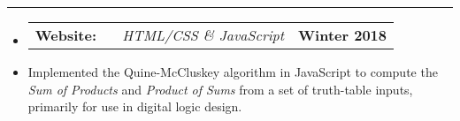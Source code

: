 \documentclass[10pt,letterpaper]{article}
\makeatletter
\newcommand{\header}[2]
{
	\begin{tabular*}{\linewidth}{l @{\extracolsep{\fill}} r}
		\hspace{-27pt} #1 & #2 \\
	\end{tabular*}
}
\makeatother
\begin{document}
\hrule

\begin{itemize}
	\item[]
		\header
			{	
				\textbf{Website: }
				\href{https://aashpointo.github.io/KmapWebsite/}{\emph{\underline{\smash{aashpointo.github.io/KmapWebsite}}}} \ \ \ \footnotesize \emph{HTML/CSS \& JavaScript}
				}
				{\textbf{Winter 2018}}
		\item
			Implemented the Quine-McCluskey algorithm in JavaScript to compute the \emph{Sum of Products} and \emph{Product of Sums} from a set of truth-table inputs, primarily for use in digital logic design.

\end{itemize}
\end{document}
